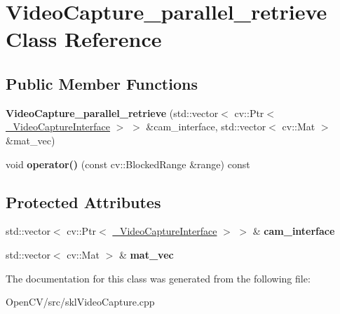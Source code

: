 \hypertarget{class_video_capture__parallel__retrieve}{}\section{Video\+Capture\+\_\+parallel\+\_\+retrieve Class Reference}
\label{class_video_capture__parallel__retrieve}
\subsection*{Public Member Functions}
\begin{DoxyCompactItemize}
\item 
\hypertarget{class_video_capture__parallel__retrieve_a9aa9a156ad89b16bd277916dfce58470}{}\label{class_video_capture__parallel__retrieve_a9aa9a156ad89b16bd277916dfce58470} 
{\bfseries Video\+Capture\+\_\+parallel\+\_\+retrieve} (std\+::vector$<$ cv\+::\+Ptr$<$ \hyperlink{classskl_1_1___video_capture_interface}{\+\_\+\+Video\+Capture\+Interface} $>$ $>$ \&cam\+\_\+interface, std\+::vector$<$ cv\+::\+Mat $>$ \&mat\+\_\+vec)
\item 
\hypertarget{class_video_capture__parallel__retrieve_a6c31905a8419293aaaf6ca7d33c94751}{}\label{class_video_capture__parallel__retrieve_a6c31905a8419293aaaf6ca7d33c94751} 
void {\bfseries operator()} (const cv\+::\+Blocked\+Range \&range) const
\end{DoxyCompactItemize}
\subsection*{Protected Attributes}
\begin{DoxyCompactItemize}
\item 
\hypertarget{class_video_capture__parallel__retrieve_a9afe7f600b55c958c9dcc5acc155df55}{}\label{class_video_capture__parallel__retrieve_a9afe7f600b55c958c9dcc5acc155df55} 
std\+::vector$<$ cv\+::\+Ptr$<$ \hyperlink{classskl_1_1___video_capture_interface}{\+\_\+\+Video\+Capture\+Interface} $>$ $>$ \& {\bfseries cam\+\_\+interface}
\item 
\hypertarget{class_video_capture__parallel__retrieve_a5c062539facc1c208ecfca311eba0323}{}\label{class_video_capture__parallel__retrieve_a5c062539facc1c208ecfca311eba0323} 
std\+::vector$<$ cv\+::\+Mat $>$ \& {\bfseries mat\+\_\+vec}
\end{DoxyCompactItemize}


The documentation for this class was generated from the following file\+:\begin{DoxyCompactItemize}
\item 
Open\+C\+V/src/skl\+Video\+Capture.\+cpp\end{DoxyCompactItemize}
